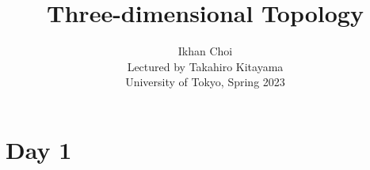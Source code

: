 \documentclass{../../small}
\begin{document}
\title{Three-dimensional Topology}
\author{Ikhan Choi\\Lectured by Takahiro Kitayama\\University of Tokyo, Spring 2023}
\maketitle
\tableofcontents

\newpage
\section{Day 1}
\end{document}
